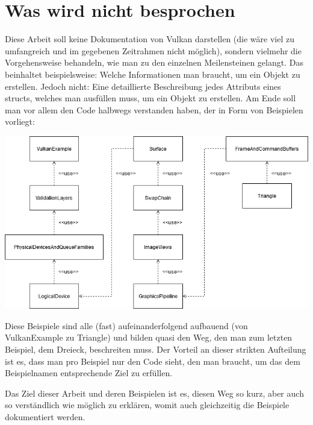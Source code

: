\documentclass[11pt,a4paper]{report}
\begin{document}
\section{Was wird nicht besprochen}
Diese Arbeit soll keine Dokumentation von Vulkan darstellen (die wäre viel zu umfangreich und im gegebenen Zeitrahmen nicht möglich), sondern vielmehr die Vorgehensweise behandeln, wie man zu den einzelnen Meilensteinen gelangt. Das beinhaltet beispielsweise: Welche Informationen man braucht, um ein Objekt zu erstellen. Jedoch nicht: Eine detaillierte Beschreibung jedes Attributs eines structs, welches man ausfüllen muss, um ein Objekt zu erstellen. Am Ende soll man vor allem den Code halbwegs verstanden haben, der in Form von Beispielen vorliegt:
\newpage
\begin{adjustwidth}{-2cm}{-2cm}
\begin{center}
	\includegraphics[scale=0.65]{class_dependency_diagram}
\end{center}
\end{adjustwidth}
Diese Beispiele sind alle (fast) aufeinanderfolgend aufbauend (von VulkanExample zu Triangle) und bilden quasi den Weg, den man zum letzten Beispiel, dem Dreieck, beschreiten muss. Der Vorteil an dieser strikten Aufteilung ist es, dass man pro Beispiel nur den Code sieht, den man braucht, um das dem Beispielnamen entsprechende Ziel zu erfüllen.

Das Ziel dieser Arbeit und deren Beispielen ist es, diesen Weg so kurz, aber auch so verständlich wie möglich zu erklären, womit auch gleichzeitig die Beispiele dokumentiert werden.
\end{document}
